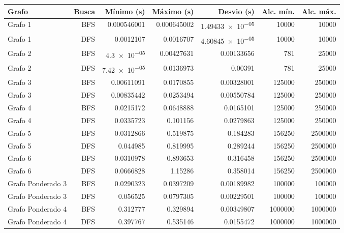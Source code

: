 \documentclass[a4paper,12pt]{article}
\begin{document}
\par\smallskip\noindent\begin{minipage}{\textwidth}\centering
\begingroup\fontsize{8.3}{10.5}\selectfont
\setlength{\tabcolsep}{4pt}
\begin{tabular}{lrrrrrr}
\toprule
Grafo & Busca & Mínimo (s) & Máximo (s) & Desvio (s) & Alc. mín. & Alc. máx. \\
\midrule
Grafo 1 & BFS & \num{0.000546001} & \num{0.000645002} & \num{1.49433e-05} & \num{10000} & \num{10000} \\
Grafo 1 & DFS & \num{0.0012107} & \num{0.0016707} & \num{4.60845e-05} & \num{10000} & \num{10000} \\
Grafo 2 & BFS & \num{4.3e-05} & \num{0.00427631} & \num{0.00133656} & \num{781} & \num{25000} \\
Grafo 2 & DFS & \num{7.42e-05} & \num{0.0136973} & \num{0.00391} & \num{781} & \num{25000} \\
Grafo 3 & BFS & \num{0.00611091} & \num{0.0170855} & \num{0.00328001} & \num{125000} & \num{250000} \\
Grafo 3 & DFS & \num{0.00835442} & \num{0.0253494} & \num{0.00550784} & \num{125000} & \num{250000} \\
Grafo 4 & BFS & \num{0.0215172} & \num{0.0648888} & \num{0.0165101} & \num{125000} & \num{250000} \\
Grafo 4 & DFS & \num{0.0335723} & \num{0.101156} & \num{0.0279863} & \num{125000} & \num{250000} \\
Grafo 5 & BFS & \num{0.0312866} & \num{0.519875} & \num{0.184283} & \num{156250} & \num{2500000} \\
Grafo 5 & DFS & \num{0.044985} & \num{0.819995} & \num{0.289244} & \num{156250} & \num{2500000} \\
Grafo 6 & BFS & \num{0.0310978} & \num{0.893653} & \num{0.316458} & \num{156250} & \num{2500000} \\
Grafo 6 & DFS & \num{0.0666828} & \num{1.15286} & \num{0.358014} & \num{156250} & \num{2500000} \\
Grafo Ponderado 3 & BFS & \num{0.0290323} & \num{0.0397209} & \num{0.00189982} & \num{100000} & \num{100000} \\
Grafo Ponderado 3 & DFS & \num{0.056525} & \num{0.0797305} & \num{0.00229501} & \num{100000} & \num{100000} \\
Grafo Ponderado 4 & BFS & \num{0.312777} & \num{0.329894} & \num{0.00349807} & \num{1000000} & \num{1000000} \\
Grafo Ponderado 4 & DFS & \num{0.397767} & \num{0.535146} & \num{0.0155472} & \num{1000000} & \num{1000000} \\

\end{tabular}
\end{minipage}
\end{document}
